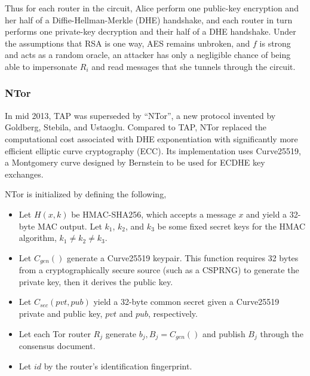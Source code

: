 Thus for each router in the circuit, Alice perform one public-key encryption and her half of a Diffie-Hellman-Merkle (DHE) handshake, and each router in turn performs one private-key decryption and their half of a DHE handshake. Under the assumptions that RSA is one way, AES remains unbroken, and $ f $ is strong and acts as a random oracle, an attacker has only a negligible chance of being able to impersonate $ R_{i} $ and read messages that she tunnels through the circuit.\cite{goldberg2006security}

\subsubsection{NTor}


In mid 2013, TAP was superseded by ``NTor'', a new protocol invented by Goldberg, Stebila, and Ustaoglu.\cite{goldberg2013anonymity} Compared to TAP, NTor replaced the computational cost associated with DHE exponentiation with significantly more efficient elliptic curve cryptography (ECC). Its implementation uses Curve25519,\cite{bernstein2006curve25519} a Montgomery curve designed by Bernstein to be used for ECDHE key exchanges.

NTor is initialized by defining the following,

\begin{itemize}
	\item Let $ H(x,k) $ be HMAC-SHA256, which accepts a message $ x $ and yield a 32-byte MAC output. Let $ k_{1} $, $ k_{2} $, and $ k_{3} $ be some fixed secret keys for the HMAC algorithm, $ k_{1} \neq k_{2} \neq k_{3} $.
	\item Let $ \mathit{C}_{\mathit{gen}}() $ generate a Curve25519 keypair. This function requires 32 bytes from a cryptographically secure source (such as a CSPRNG) to generate the private key, then it derives the public key.
	\item Let $ \mathit{C}_{\mathit{sec}}(pvt, pub) $ yield a 32-byte common secret given a Curve25519 private and public key, $ pvt $ and $ pub $, respectively.
	\item Let each Tor router $ R_{j} $ generate $ b_{j},B_{j} = \mathit{C}_{\mathit{gen}}() $ and publish $ B_{j} $ through the consensus document.
	\item Let $ \mathit{id} $ by the router's identification fingerprint.
\end{itemize}

